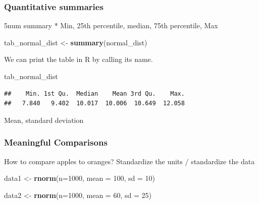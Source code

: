 \documentclass[
]{book}
\newenvironment{Shaded}{\begin{snugshade}}{\end{snugshade}}
\newcommand{\AttributeTok}[1]{\textcolor[rgb]{0.13,0.29,0.53}{#1}}
\newcommand{\DecValTok}[1]{\textcolor[rgb]{0.00,0.00,0.81}{#1}}
\newcommand{\FunctionTok}[1]{\textcolor[rgb]{0.13,0.29,0.53}{\textbf{#1}}}
\newcommand{\NormalTok}[1]{#1}
\newcommand{\OtherTok}[1]{\textcolor[rgb]{0.56,0.35,0.01}{#1}}
\begin{document}
\hypertarget{quantitative-summaries}{%
\subsubsection{Quantitative summaries}\label{quantitative-summaries}}

5num summary
* Min, 25th percentile, median, 75th percentile, Max

\begin{Shaded}
\begin{Highlighting}[]
\NormalTok{tab\_normal\_dist }\OtherTok{\textless{}{-}} \FunctionTok{summary}\NormalTok{(normal\_dist)}
\end{Highlighting}
\end{Shaded}

We can print the table in R by calling its name.

\begin{Shaded}
\begin{Highlighting}[]
\NormalTok{tab\_normal\_dist}
\end{Highlighting}
\end{Shaded}

\begin{verbatim}
##    Min. 1st Qu.  Median    Mean 3rd Qu.    Max. 
##   7.840   9.402  10.017  10.006  10.649  12.058
\end{verbatim}

Mean, standard deviation

\hypertarget{meaningful-comparisons}{%
\subsubsection{Meaningful Comparisons}\label{meaningful-comparisons}}

How to compare apples to oranges? Standardize the units / standardize the data

\begin{Shaded}
\begin{Highlighting}[]
\NormalTok{data1 }\OtherTok{\textless{}{-}} \FunctionTok{rnorm}\NormalTok{(}\AttributeTok{n=}\DecValTok{1000}\NormalTok{, }
              \AttributeTok{mean =} \DecValTok{100}\NormalTok{,}
              \AttributeTok{sd =} \DecValTok{10}\NormalTok{)}

\NormalTok{data2 }\OtherTok{\textless{}{-}} \FunctionTok{rnorm}\NormalTok{(}\AttributeTok{n=}\DecValTok{1000}\NormalTok{,}
               \AttributeTok{mean =} \DecValTok{60}\NormalTok{, }
               \AttributeTok{sd =} \DecValTok{25}\NormalTok{)}
\end{Highlighting}
\end{Shaded}
\end{document}
